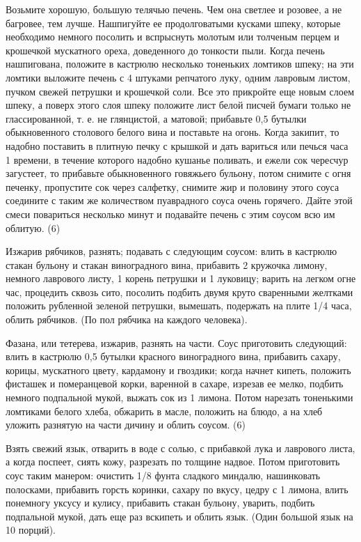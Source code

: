 Возьмите хорошую, большую телячью печень. Чем она светлее и розовее, а не багровее, тем лучше. Нашпигуйте ее продолговатыми кусками шпеку, которые необходимо немного посолить и вспрыснуть молотым или толченым перцем и крошечкой мускатного ореха, доведенного до тонкости пыли. Когда печень нашпигована, положите в кастрюлю несколько тоненьких ломтиков шпеку; на эти ломтики выложите печень с 4 штуками репчатого луку, одним лавровым листом, пучком свежей петрушки и крошечкой соли. Все это прикройте еще новым слоем шпеку, а поверх этого слоя шпеку положите лист белой писчей бумаги только не глассированной, т. е. не глянцистой, а матовой; прибавьте 0,5 бутылки обыкновенного столового белого вина и поставьте на огонь. Когда закипит, то надобно поставить в плитную печку с крышкой и дать вариться или печься часа 1 времени, в течение которого надобно кушанье поливать, и ежели сок чересчур загустеет, то прибавьте обыкновенного говяжьего бульону, потом снимите с огня печенку, пропустите сок через салфетку, снимите жир и половину этого соуса соедините с таким же количеством пуаврадного соуса очень горячего. Дайте этой смеси повариться несколько минут и подавайте печень с этим соусом всю им облитую. (6)


Изжарив рябчиков, разнять; подавать с следующим соусом: влить в кастрюлю стакан бульону и стакан виноградного вина, прибавить 2 кружочка лимону, немного лаврового листу, 1 корень петрушки и 1 луковицу; варить на легком огне час, процедить сквозь сито, посолить подбить двумя круто сваренными желтками положить рубленной зеленой петрушки, вымешать, подержать на плите 1/4 часа, облить рябчиков. (По пол рябчика на каждого человека). 


Фазана, или тетерева, изжарив, разнять на части. Соус приготовить следующий: влить в кастрюлю 0,5 бутылки красного виноградного вина, прибавить сахару, корицы, мускатного цвету, кардамону и гвоздики; когда начнет кипеть, положить фисташек и померанцевой корки, варенной в сахаре, изрезав ее мелко, подбить немного подпальной мукой, выжать сок из 1 лимона. Потом нарезать тоненькими ломтиками белого хлеба, обжарить в масле, положить на блюдо, а на хлеб уложить разнятую на части дичину и облить соусом. (6) 


Взять свежий язык, отварить в воде с солью, с прибавкой лука и лаврового листа, а когда поспеет, сиять кожу, разрезать по толщине надвое. Потом приготовить соус таким манером: очистить 1/8 фунта сладкого миндалю, нашинковать полосками, прибавить горсть коринки, сахару по вкусу, цедру с 1 лимона, влить понемногу уксусу и кулису, прибавить стакан бульону, уварить, подбить подпальной мукой, дать еще раз вскипеть и облить язык. (Один большой язык на 10 порций). 

